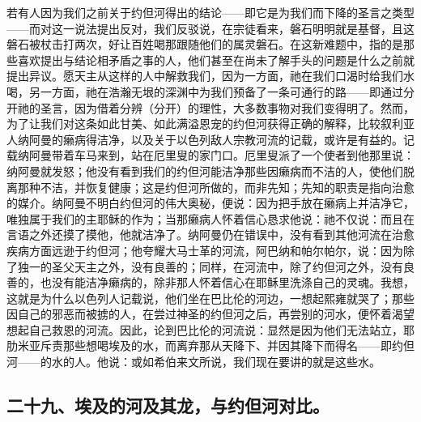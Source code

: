 若有人因为我们之前关于约但河得出的结论——即它是为我们而下降的圣言之类型——而对这一说法提出反对，我们反驳说，在宗徒看来，磐石明明就是基督，且这磐石被杖击打两次，好让百姓喝那跟随他们的属灵磐石。在这新难题中，指的是那些喜欢提出与结论相矛盾之事的人，他们甚至在尚未了解手头的问题是什么之前就提出异议。愿天主从这样的人中解救我们，因为一方面，祂在我们口渴时给我们水喝，另一方面，祂在浩瀚无垠的深渊中为我们预备了一条可通行的路——即通过分开祂的圣言，因为借着分辨（分开）的理性，大多数事物对我们变得明了。然而，为了让我们对这条如此甘美、如此满溢恩宠的约但河获得正确的解释，比较叙利亚人纳阿曼的癞病得洁净，以及关于以色列敌人宗教河流的记载，或许是有益的。记载纳阿曼带着车马来到，站在厄里叟的家门口。厄里叟派了一个使者到他那里说：纳阿曼就发怒；他没有看到我们的约但河能洁净那些因癞病而不洁的人，使他们脱离那种不洁，并恢复健康；这是约但河所做的，而非先知；先知的职责是指向治愈的媒介。纳阿曼不明白约但河的伟大奥秘，便说：因为把手放在癞病上并洁净它，唯独属于我们的主耶稣的作为；当那癞病人怀着信心恳求他说：祂不仅说：而且在言语之外还摸了摸他，他就洁净了。纳阿曼仍在错误中，没有看到其他河流在治愈疾病方面远逊于约但河；他夸耀大马士革的河流，阿巴纳和帕尔帕尔，说：因为除了独一的圣父天主之外，没有良善的；同样，在河流中，除了约但河之外，没有良善的，也没有能洁净癞病的，除非那人怀着信心在耶稣里洗涤自己的灵魂。我想，这就是为什么以色列人记载说，他们坐在巴比伦的河边，一想起熙雍就哭了；那些因自己的邪恶而被掳的人，在尝过神圣的约但河之后，再尝别的河水，便怀着渴望想起自己救恩的河流。因此，论到巴比伦的河流说：显然是因为他们无法站立，耶肋米亚斥责那些想喝埃及的水，而离弃那从天降下、并因其降下而得名——即约但河——的水的人。他说：或如希伯来文所说，我们现在要讲的就是这些水。\par


\subsection{二十九、埃及的河及其龙，与约但河对比。}


